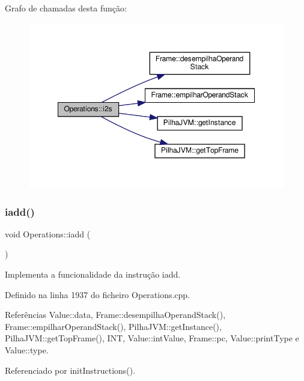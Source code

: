 Grafo de chamadas desta função\+:\nopagebreak
\begin{figure}[H]
\begin{center}
\leavevmode
\includegraphics[width=348pt]{classOperations_ab83ebb06495a6e42c5edeec05e312f8c_cgraph}
\end{center}
\end{figure}
\mbox{\label{classOperations_a12d5933f0d0c91c578b76edb1971a2be}} 
\subsubsection{\texorpdfstring{iadd()}{iadd()}}
{\footnotesize\ttfamily void Operations\+::iadd (\begin{DoxyParamCaption}{ }\end{DoxyParamCaption})\hspace{0.3cm}{\ttfamily [private]}}



Implementa a funcionalidade da instrução iadd. 



Definido na linha 1937 do ficheiro Operations.\+cpp.



Referências Value\+::data, Frame\+::desempilha\+Operand\+Stack(), Frame\+::empilhar\+Operand\+Stack(), Pilha\+J\+V\+M\+::get\+Instance(), Pilha\+J\+V\+M\+::get\+Top\+Frame(), I\+NT, Value\+::int\+Value, Frame\+::pc, Value\+::print\+Type e Value\+::type.



Referenciado por init\+Instructions().

